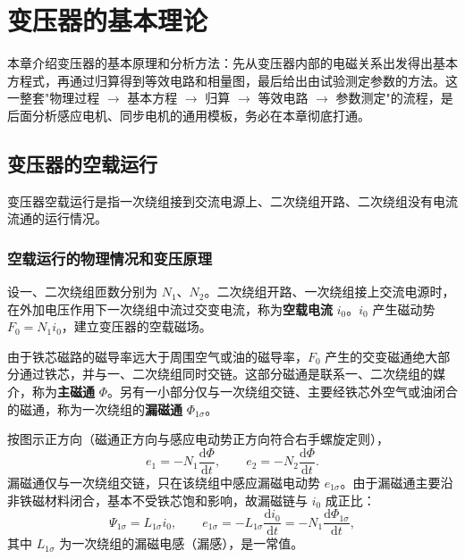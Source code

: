 \chapter{变压器的基本理论}

本章介绍变压器的基本原理和分析方法：先从变压器内部的电磁关系出发得出基本方程式，再通过归算得到等效电路和相量图，最后给出由试验测定参数的方法。这一整套"物理过程 $\rightarrow$ 基本方程 $\rightarrow$ 归算 $\rightarrow$ 等效电路 $\rightarrow$ 参数测定"的流程，是后面分析感应电机、同步电机的通用模板，务必在本章彻底打通。

\section{变压器的空载运行}

变压器空载运行是指一次绕组接到交流电源上、二次绕组开路、二次绕组没有电流流通的运行情况。

\subsection{空载运行的物理情况和变压原理}
设一、二次绕组匝数分别为 $N_1$、$N_2$。二次绕组开路、一次绕组接上交流电源时，在外加电压作用下一次绕组中流过交变电流，称为\textbf{空载电流} $i_0$。$i_0$ 产生磁动势 $F_0=N_1i_0$，建立变压器的空载磁场。

由于铁芯磁路的磁导率远大于周围空气或油的磁导率，$F_0$ 产生的交变磁通绝大部分通过铁芯，并与一、二次绕组同时交链。这部分磁通是联系一、二次绕组的媒介，称为\textbf{主磁通} $\Phi$。另有一小部分仅与一次绕组交链、主要经铁芯外空气或油闭合的磁通，称为一次绕组的\textbf{漏磁通} $\Phi_{1\sigma}$。

按图示正方向（磁通正方向与感应电动势正方向符合右手螺旋定则），
\begin{equation}
e_1=-N_1\frac{\mathrm{d}\Phi}{\mathrm{d}t},\qquad e_2=-N_2\frac{\mathrm{d}\Phi}{\mathrm{d}t}.
\end{equation}
漏磁通仅与一次绕组交链，只在该绕组中感应漏磁电动势 $e_{1\sigma}$。由于漏磁通主要沿非铁磁材料闭合，基本不受铁芯饱和影响，故漏磁链与 $i_0$ 成正比：
\begin{equation}
\Psi_{1\sigma}=L_{1\sigma}i_0,\qquad
e_{1\sigma}=-L_{1\sigma}\frac{\mathrm{d}i_0}{\mathrm{d}t}=-N_1\frac{\mathrm{d}\Phi_{1\sigma}}{\mathrm{d}t},
\end{equation}
其中 $L_{1\sigma}$ 为一次绕组的漏磁电感（漏感），是一常值。

